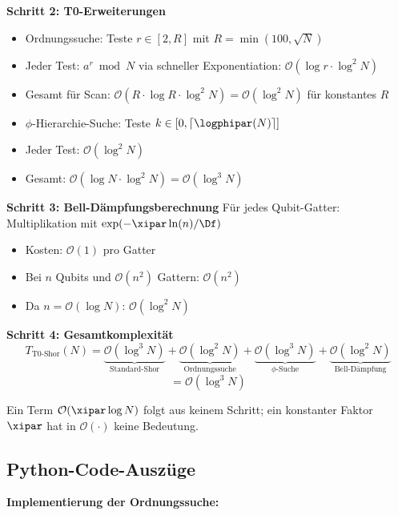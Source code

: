 \textbf{Schritt 2: T0-Erweiterungen}
\begin{itemize}
	\item Ordnungssuche: Teste $r \in [2, R]$ mit $R = \min(100, \sqrt{N})$
	\item Jeder Test: $a^r \bmod N$ via schneller Exponentiation: $\mathcal{O}(\log r \cdot \log^2 N)$
	\item Gesamt für Scan: $\mathcal{O}(R \cdot \log R \cdot \log^2 N) = \mathcal{O}(\log^2 N)$ für konstantes $R$
	\item $\phi$-Hierarchie-Suche: Teste $k \in [0, \lceil \logphipar(N) \rceil]$
	\item Jeder Test: $\mathcal{O}(\log^2 N)$
	\item Gesamt: $\mathcal{O}(\log N \cdot \log^2 N) = \mathcal{O}(\log^3 N)$
\end{itemize}

\textbf{Schritt 3: Bell-Dämpfungsberechnung}
Für jedes Qubit-Gatter: Multiplikation mit $\exp(-\xipar \ln(n)/\Df)$
\begin{itemize}
	\item Kosten: $\mathcal{O}(1)$ pro Gatter
	\item Bei $n$ Qubits und $\mathcal{O}(n^2)$ Gattern: $\mathcal{O}(n^2)$
	\item Da $n = \mathcal{O}(\log N)$: $\mathcal{O}(\log^2 N)$
\end{itemize}

\textbf{Schritt 4: Gesamtkomplexität}
\[
T_{\text{T0-Shor}}(N) = \underbrace{\mathcal{O}(\log^3 N)}_{\text{Standard-Shor}} 
+ \underbrace{\mathcal{O}(\log^2 N)}_{\text{Ordnungssuche}} 
+ \underbrace{\mathcal{O}(\log^3 N)}_{\phi\text{-Suche}} 
+ \underbrace{\mathcal{O}(\log^2 N)}_{\text{Bell-Dämpfung}}
\]
\[
= \mathcal{O}(\log^3 N)
\]

Ein Term $\mathcal{O}(\xipar\log N)$ folgt aus keinem Schritt; ein konstanter Faktor $\xipar$ hat in $\mathcal{O}(\cdot)$ keine Bedeutung.

\subsection{Python-Code-Auszüge}
\label{app:code}

\textbf{Implementierung der Ordnungssuche:}

